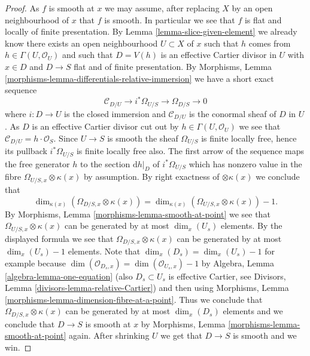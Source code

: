 \documentclass[10pt,a4paper]{amsart}
\theoremstyle{plain}
\theoremstyle{definition}
\theoremstyle{remark}
\numberwithin{equation}{subsection}
\begin{document}
\begin{proof}
As $f$ is smooth at $x$ we may assume, after replacing $X$ by an open
neighbourhood of $x$ that $f$ is smooth. In particular we see that
$f$ is flat and locally of finite presentation. By
Lemma \ref{lemma-slice-given-element}
we already know there exists an open neighbourhood $U \subset X$ of $x$
such that $h$ comes from $h \in \Gamma(U, \mathcal{O}_U)$ and such
that $D = V(h)$ is an effective Cartier divisor in $U$ with $x \in D$ and
$D \to S$ flat and of finite presentation. By
Morphisms, Lemma \ref{morphisms-lemma-differentials-relative-immersion}
we have a short exact sequence
$$
\mathcal{C}_{D/U} \to i^*\Omega_{U/S} \to \Omega_{D/S} \to 0
$$
where $i : D \to U$ is the closed immersion and $\mathcal{C}_{D/U}$
is the conormal sheaf of $D$ in $U$. As $D$ is an effective Cartier
divisor cut out by $h \in \Gamma(U, \mathcal{O}_U)$ we see that
$\mathcal{C}_{D/U} = h \cdot \mathcal{O}_S$. Since $U \to S$ is smooth
the sheaf $\Omega_{U/S}$ is finite locally free, hence its pullback
$i^*\Omega_{U/S}$ is finite locally free also. The first arrow of
the sequence maps the free generator $h$ to the section $\text{d}h|_D$
of $i^*\Omega_{U/S}$ which has nonzero value in the fibre
$\Omega_{U/S, x} \otimes \kappa(x)$ by assumption. By right exactness
of $\otimes \kappa(x)$ we conclude that
$$
\dim_{\kappa(x)} \left( \Omega_{D/S, x} \otimes \kappa(x) \right)
=
\dim_{\kappa(x)} \left( \Omega_{U/S, x} \otimes \kappa(x) \right) - 1.
$$
By
Morphisms, Lemma \ref{morphisms-lemma-smooth-at-point}
we see that $\Omega_{U/S, x} \otimes \kappa(x)$ can be generated by
at most $\dim_x(U_s)$ elements. By the displayed formula we see that
$\Omega_{D/S, x} \otimes \kappa(x)$ can be generated by at most
$\dim_x(U_s) - 1$ elements. Note that
$\dim_x(D_s) = \dim_x(U_s) - 1$ for example because
$\dim(\mathcal{O}_{D_s, x}) = \dim(\mathcal{O}_{U_s, x}) - 1$ by
Algebra, Lemma \ref{algebra-lemma-one-equation}
(also $D_s \subset U_s$ is effective Cartier, see
Divisors, Lemma \ref{divisors-lemma-relative-Cartier})
and then using
Morphisms, Lemma \ref{morphisms-lemma-dimension-fibre-at-a-point}.
Thus we conclude that $\Omega_{D/S, x} \otimes \kappa(x)$ can be generated
by at most $\dim_x(D_s)$ elements and we conclude that $D \to S$
is smooth at $x$ by
Morphisms, Lemma \ref{morphisms-lemma-smooth-at-point}
again. After shrinking $U$ we get that $D \to S$ is smooth and we win.
\end{proof}
\end{document}

